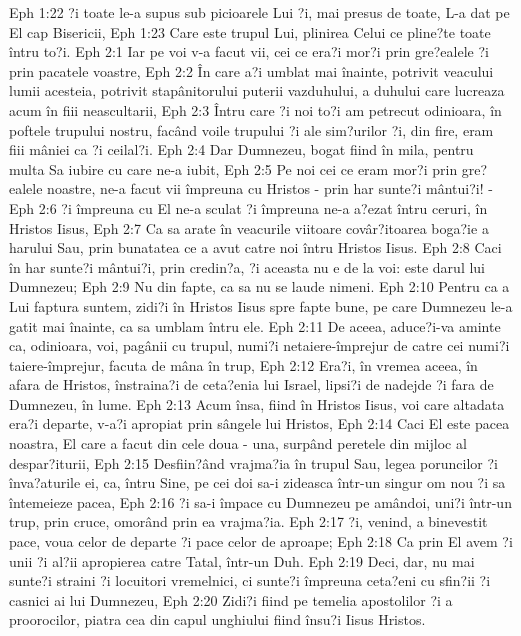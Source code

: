 Eph 1:22  ?i toate le-a supus sub picioarele Lui ?i, mai presus de toate, L-a dat pe El cap Bisericii,
Eph 1:23  Care este trupul Lui, plinirea Celui ce pline?te toate întru to?i.
Eph 2:1  Iar pe voi v-a facut vii, cei ce era?i mor?i prin gre?ealele ?i prin pacatele voastre,
Eph 2:2  În care a?i umblat mai înainte, potrivit veacului lumii acesteia, potrivit stapânitorului puterii vazduhului, a duhului care lucreaza acum în fiii neascultarii,
Eph 2:3  Întru care ?i noi to?i am petrecut odinioara, în poftele trupului nostru, facând voile trupului ?i ale sim?urilor ?i, din fire, eram fiii mâniei ca ?i ceilal?i.
Eph 2:4  Dar Dumnezeu, bogat fiind în mila, pentru multa Sa iubire cu care ne-a iubit,
Eph 2:5  Pe noi cei ce eram mor?i prin gre?ealele noastre, ne-a facut vii împreuna cu Hristos - prin har sunte?i mântui?i! -
Eph 2:6  ?i împreuna cu El ne-a sculat ?i împreuna ne-a a?ezat întru ceruri, în Hristos Iisus,
Eph 2:7  Ca sa arate în veacurile viitoare covâr?itoarea boga?ie a harului Sau, prin bunatatea ce a avut catre noi întru Hristos Iisus.
Eph 2:8  Caci în har sunte?i mântui?i, prin credin?a, ?i aceasta nu e de la voi: este darul lui Dumnezeu;
Eph 2:9  Nu din fapte, ca sa nu se laude nimeni.
Eph 2:10  Pentru ca a Lui faptura suntem, zidi?i în Hristos Iisus spre fapte bune, pe care Dumnezeu le-a gatit mai înainte, ca sa umblam întru ele.
Eph 2:11  De aceea, aduce?i-va aminte ca, odinioara, voi, pagânii cu trupul, numi?i netaiere-împrejur de catre cei numi?i taiere-împrejur, facuta de mâna în trup,
Eph 2:12  Era?i, în vremea aceea, în afara de Hristos, înstraina?i de ceta?enia lui Israel, lipsi?i de nadejde ?i fara de Dumnezeu, în lume.
Eph 2:13  Acum însa, fiind în Hristos Iisus, voi care altadata era?i departe, v-a?i apropiat prin sângele lui Hristos,
Eph 2:14  Caci El este pacea noastra, El care a facut din cele doua - una, surpând peretele din mijloc al despar?iturii,
Eph 2:15  Desfiin?ând vrajma?ia în trupul Sau, legea poruncilor ?i înva?aturile ei, ca, întru Sine, pe cei doi sa-i zideasca într-un singur om nou ?i sa întemeieze pacea,
Eph 2:16  ?i sa-i împace cu Dumnezeu pe amândoi, uni?i într-un trup, prin cruce, omorând prin ea vrajma?ia.
Eph 2:17  ?i, venind, a binevestit pace, voua celor de departe ?i pace celor de aproape;
Eph 2:18  Ca prin El avem ?i unii ?i al?ii apropierea catre Tatal, într-un Duh.
Eph 2:19  Deci, dar, nu mai sunte?i straini ?i locuitori vremelnici, ci sunte?i împreuna ceta?eni cu sfin?ii ?i casnici ai lui Dumnezeu,
Eph 2:20  Zidi?i fiind pe temelia apostolilor ?i a proorocilor, piatra cea din capul unghiului fiind însu?i Iisus Hristos.
